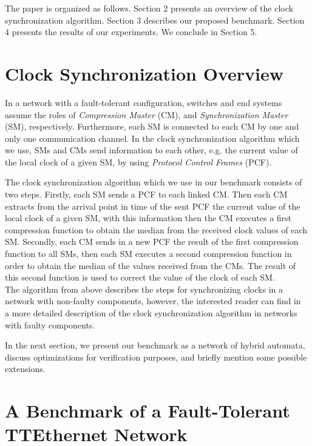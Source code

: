 The paper is organized as follows. Section 2 presents an overview of the
clock synchronization algorithm. Section 3 describes our proposed benchmark. 
Section 4 presents the results of our experiments. We conclude in Section 5.
  
\section{Clock Synchronization Overview}
\label{sec:clocksyncoverview}

In a network with a fault-tolerant configuration, switches and end systems assume 
the roles of \emph{Compression Master} (CM), and \emph{Synchronization Master} (SM), 
respectively. Furthermore, each SM is connected to each CM by one and only one communication channel.
In the clock synchronization algorithm which we use, SMs and CMs send information to each other, 
e.g. the current value of the local clock of a given SM, by using \emph{Protocol Control Frames} (PCF).

The clock synchronization algorithm which we use in our benchmark consists of two steps. Firstly, 
each SM sends a PCF to each linked CM. Then each CM extracts from the arrival point in time
of the sent PCF the current value of the local clock of a given SM, 
with this information then the CM executes a first compression function to obtain the median 
from the received clock values of each SM. Secondly, each CM sends in a new PCF the result of 
the first compression function to all SMs, then each SM executes a second compression function
in order to obtain the median of the values received from the CMs. The result of this 
second function is used to correct the value of the clock of each SM. \\
%
The algorithm from above describes the steps for synchronizing clocks in a  
network with non-faulty components, however, the interested reader can find 
in~\cite{Steiner2} a more detailed description of the clock synchronization 
algorithm in networks with faulty components.  

In the next section, we present our benchmark as a network of hybrid automata, 
discuss optimizations for verification purposes, and briefly mention
some possible extensions. 

\section{A Benchmark of a Fault-Tolerant TTEthernet Network}

